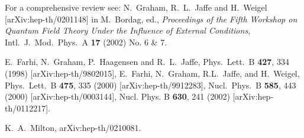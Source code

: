 \documentclass[a4paper,aps,amsfonts,prl,showpacs,nobibnotes,nofootinbib,%
tightenlines,twocolumn]{revtex4}
\begin{document}
\begin{thebibliography}{99}
For a comprehensive review see:
N.\ Graham, R.\ L.\ Jaffe and H.\ Weigel [arXiv:hep-th/0201148]
in M.\ Bordag, ed., {\it Proceedings of the Fifth Workshop on Quantum
Field Theory Under the Influence of External Conditions},
Intl.\ J.\ Mod.\ Phys.\ A {\bf 17} (2002) No. 6 \& 7.

E.\ Farhi, N.\ Graham, P.\ Haagensen and R.\ L.\ Jaffe, Phys.\ Lett.\ B
{\bf 427}, 334 (1998) [arXiv:hep-th/9802015],
E.\ Farhi, N.\ Graham, R.L.\ Jaffe, and H.\ Weigel,
Phys.\ Lett.\ B {\bf 475}, 335 (2000) [arXiv:hep-th/9912283],
Nucl.\ Phys.\ B {\bf 585}, 443 (2000) [arXiv:hep-th/0003144],
Nucl. Phys. B {\bf 630}, 241 (2002) [arXiv:hep-th/0112217].


K.~A.~Milton,
arXiv:hep-th/0210081.
\end{thebibliography}


\end{document}
